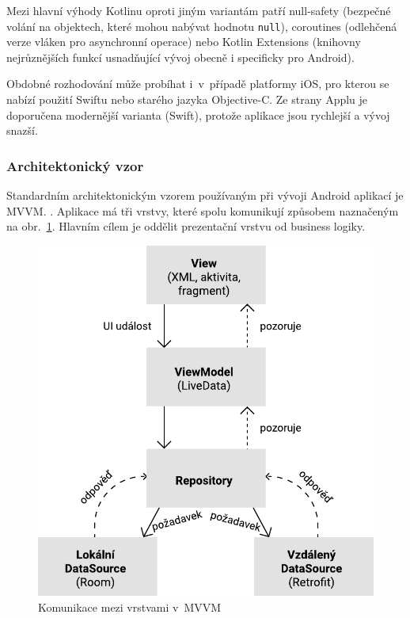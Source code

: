 \documentclass[twoside]{ctuthesis}
\begin{document}
Mezi hlavní výhody Kotlinu oproti jiným variantám patří null-safety (bezpečné volání na objektech, které mohou nabývat hodnotu \texttt{null}), coroutines (odlehčená verze vláken pro asynchronní operace) nebo Kotlin Extensions (knihovny nejrůznějších funkcí usnadňující vývoj obecně i specificky pro Android). \cite{android2021kotlin}

Obdobné rozhodování může probíhat i~v~případě platformy iOS, pro kterou se nabízí použití Swiftu nebo starého jazyka Objective-C. Ze strany Applu je doporučena modernější varianta (Swift), protože aplikace jsou rychlejší a vývoj snazší.

\subsubsection{Architektonický vzor}
Standardním architektonickým vzorem používaným při vývoji Android aplikací je MVVM. \cite{android2020guide}. Aplikace má tři vrstvy, které spolu komunikují způsobem naznačeným na obr.~\ref{fig:mvvm}. Hlavním cílem je oddělit prezentační vrstvu od business logiky.  \cite{shekhar2020mvvm}

\begin{figure}[h!]
	\includegraphics[scale=0.7]{img/mvvm-architecture.pdf}
	\caption{Komunikace mezi vrstvami v~MVVM}
	\label{fig:mvvm}
\end{figure}
\end{document}
